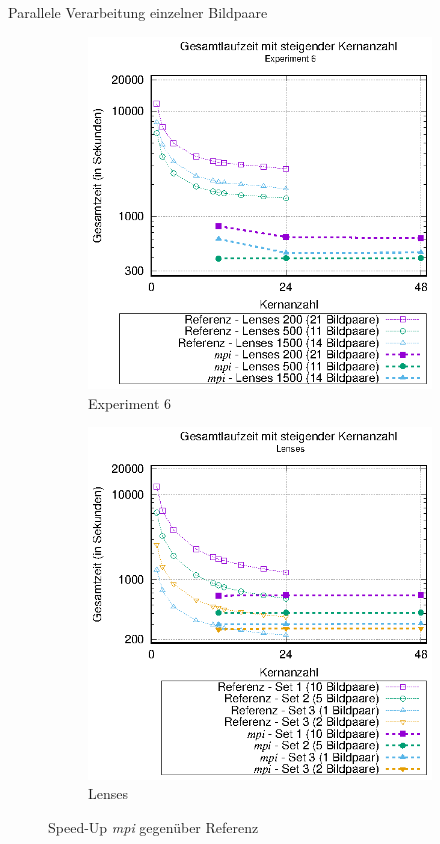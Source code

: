 \begin{frame}[allowframebreaks]{Parallele Verarbeitung einzelner Bildpaare}
	\begin{figure}[h]
		\begin{subfigure}[b]{0.47\textwidth}
			\centering
			\includegraphics[width=\textwidth]{pdf/mpi_times_exp6}
			\caption{Experiment 6}
		\end{subfigure}
		\hfill
		\begin{subfigure}[b]{0.47\textwidth}
			\centering
			\includegraphics[width=\textwidth]{pdf/mpi_times_lenses}
			\caption{Lenses}
		\end{subfigure}
		\caption{Speed-Up \textit{mpi} gegenüber Referenz}
	\end{figure}
\end{frame}

